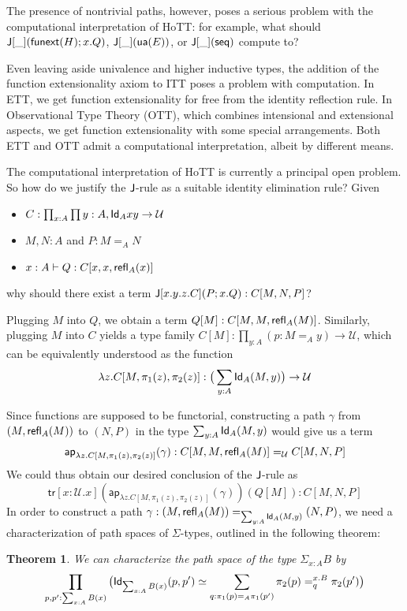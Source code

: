 \documentclass[12pt]{article}
\newtheorem{thm}{Theorem}
\newcommand{\ap}{\mathsf{ap}}
\newcommand{\tr}{\mathsf{tr}}
\newcommand{\seq}{\mathsf{seq}}
\begin{document}
The presence of nontrivial paths, however, poses a serious problem with the computational interpretation of HoTT: for example, what should $\mathsf{J}[\_](\mathsf{funext}(H);x.Q)$, $\mathsf{J}[\_](\mathsf{ua}(E))$, or $\J[\_](\seq)$ compute to? 

Even leaving aside univalence and higher inductive types, the addition of the function extensionality axiom to ITT poses a problem with computation. In ETT, we get function extensionality for free from the identity reflection rule. In Observational Type Theory (OTT), which combines intensional and extensional aspects, we get function extensionality with some special arrangements. Both ETT and OTT admit a computational interpretation, albeit by different means. 

The computational interpretation of HoTT is currently a principal open problem. So how do we justify the $\mathsf{J}$-rule as a suitable identity elimination rule? Given

\begin{itemize}
\item $C : \prod_{x : A} \prod{y : A}, \mathsf{Id}_{A}{x}{y} \to \mathcal{U}$
\item $M,N:A$ and $P:M=_A N$
\item $x:A\vdash Q:C[x,x,\mathsf{refl}_{A}(x)]$
\end{itemize}
why should there exist a term $\mathsf{J}[x.y.z.C](P;x.Q):C[M,N,P]$?

Plugging $M$ into $Q$, we obtain a term $Q[M]:C[M,M,\mathsf{refl}_{A}(M)]$. Similarly, plugging $M$ into $C$ yields a type family $C[M] : \prod_{y:A}(p:M=_A y)\to\mathcal{U}$, which can be equivalently understood as the function \[\lambda z. C[M, \pi_1(z), \pi_2(z)] : \big(\sum_{y:A} \mathsf{Id}_{A}(M,y)\big)\to\mathcal{U} \]

Since functions are supposed to be functorial, constructing a path $\gamma$ from $(M,\mathsf{refl}_{A}(M))$ to $(N,P)$ in the type $\sum_{y:A} \mathsf{Id}_{A}(M,y)$ would give us a term
\[ \ap_{\lambda z. C[M, \pi_1(z), \pi_2(z)]}(\gamma) : C[M,M,\refl{A}(M)] =_\mathcal{U} C[M,N,P] \]
We could thus obtain our desired conclusion of the $\mathsf{J}$-rule as \[ \tr[x : \mathcal{U}.x](\ap_{\lambda z. C[M, \pi_1(z), \pi_2(z)]}(\gamma))(Q[M]) : C[M,N,P]\]
In order to construct a path {\small $\gamma : (M,\mathsf{refl}_{A}(M)) =_{\sum_{y:A} \mathsf{Id}_{A}(M,y)} (N,P)$}, we need a characterization of path spaces of $\Sigma$-types, outlined in the following theorem:

\begin{thm} We can characterize the path space of the type $\Sigma_{x:A} B$ by
\small {\[ \prod_{p,p':\sum_{x:A}B(x)} \big( \mathsf{Id}_{\sum_{x:A}B(x)}(p,p')\simeq\sum_{q:\pi_1(p)=_A\pi_1(p')}\pi_2(p) =^{x.B}_q \pi_2(p') \big) \]}
\end{thm}
\end{document}
